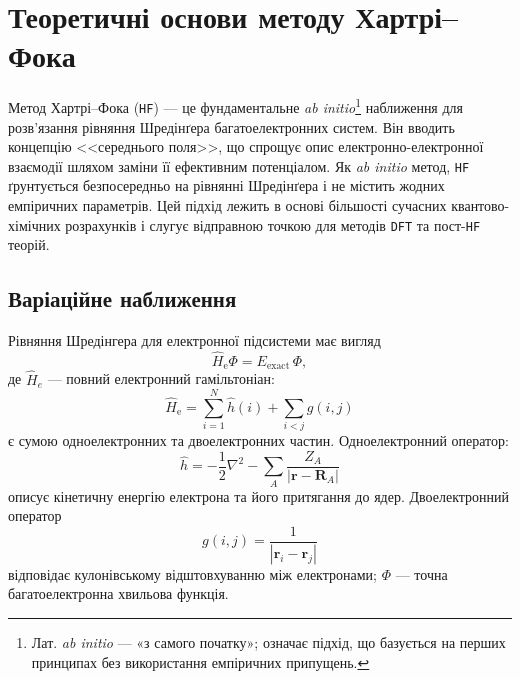 
\section{Теоретичні основи методу Хартрі–Фока}

Метод Хартрі–Фока (\texttt{HF}) --- це фундаментальне \emph{ab initio}\footnote{Лат. \emph{ab initio} --- «з самого початку»; означає підхід, що базується на перших принципах без використання емпіричних припущень.} наближення для роз\-в'язання рівняння Шредінґера багатоелектронних систем. Він вводить концепцію <<середнього поля>>, що спрощує опис електронно-електронної взаємодії шляхом заміни її ефективним потенціалом. Як \emph{ab initio} метод, \texttt{HF} ґрунтується безпосередньо на рівнянні Шредінґера і не містить жодних емпіричних параметрів. Цей підхід лежить в основі більшості сучасних квантово-хімічних розрахунків і слугує відправною точкою для методів \texttt{DFT} та пост-\texttt{HF} теорій.

\subsection{Варіаційне наближення}

Рівняння Шредінгера для електронної підсистеми має вигляд
\begin{equation}\label{eq:ShE}
	\hat{H}_\text{e} \Phi = E_{\text{exact}}\, \Phi,
\end{equation}
де \(\hat{H}_e\) --- повний електронний гамільтоніан:
\begin{equation}\label{eq:H_e}
	\hat H_\text{e}
	= \sum_{i=1}^N \hat h(i)
	+ \sum_{i<j} g(i, j)
\end{equation}
є сумою одноелектронних та двоелектронних частин. Одноелектронний оператор:
\[
	\hat h = -\frac{1}{2}\nabla^2 - \sum_A \frac{Z_A}{|\mathbf r - \mathbf R_A|}
\]
описує кінетичну енергію електрона та його притягання до ядер.
Двоелектронний оператор
\[
	g(i, j) = \frac{1}{|\mathbf r_i - \mathbf r_j|}
\]
відповідає кулонівському відштовхуванню між електронами;
\(\Phi\) --- точна багатоелектронна хвильова функція.

